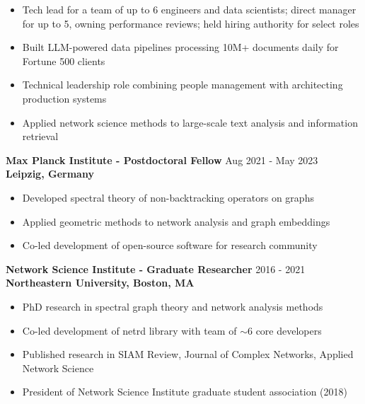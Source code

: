 \documentclass[11pt,a4paper]{article}
\newlength{\spacexs}    \setlength{\spacexs}{6pt}      %
\newlength{\spacemd}    \setlength{\spacemd}{19pt}     %
\newcommand{\bodytext}[1]{%
    {\fontsize{10pt}{14pt}\selectfont\color{charcoal} #1}%
}
\newcommand{\microtext}[1]{%
    {\fontsize{8pt}{11pt}\selectfont\color{mediumgray} #1}%
}
\newcommand{\goldbullet}{{\color{gold}$\bullet$}\space}
\newcommand{\jobduration}[1]{%
    {\fontspec{JetBrains Mono}\microtext{#1}}
}
\newcommand{\companyname}[1]{%
    {\color{darkgray}\bfseries #1}
}
\begin{document}
\vspace{\spacexs}
\begin{itemize}[leftmargin=15pt,itemindent=0pt,labelwidth=10pt,labelsep=5pt,itemsep=2pt,parsep=0pt,topsep=0pt,partopsep=0pt]
    \item[\goldbullet] \bodytext{Tech lead for a team of up to 6 engineers and data scientists; direct manager for up to 5, owning performance reviews; held hiring authority for select roles}
    \item[\goldbullet] \bodytext{Built LLM-powered data pipelines processing 10M+ documents daily for Fortune 500 clients}
    \item[\goldbullet] \bodytext{Technical leadership role combining people management with architecting production systems}
    \item[\goldbullet] \bodytext{Applied network science methods to large-scale text analysis and information retrieval}
\end{itemize}

\vspace{\spacemd}

\bodytext{\textbf{Max Planck Institute - Postdoctoral Fellow}} \hfill \jobduration{Aug 2021 - May 2023}\\
\companyname{Leipzig, Germany}

\vspace{\spacexs}
\begin{itemize}[leftmargin=15pt,itemindent=0pt,labelwidth=10pt,labelsep=5pt,itemsep=1pt,parsep=0pt,topsep=0pt,partopsep=0pt]
    \item[\goldbullet] \bodytext{Developed spectral theory of non-backtracking operators on graphs}
    \item[\goldbullet] \bodytext{Applied geometric methods to network analysis and graph embeddings}
    \item[\goldbullet] \bodytext{Co-led development of open-source software for research community}
\end{itemize}

\vspace{\spacemd}

\bodytext{\textbf{Network Science Institute - Graduate Researcher}} \hfill \jobduration{2016 - 2021}\\
\companyname{Northeastern University, Boston, MA}

\vspace{\spacexs}
\begin{itemize}[leftmargin=15pt,itemindent=0pt,labelwidth=10pt,labelsep=5pt,itemsep=1pt,parsep=0pt,topsep=0pt,partopsep=0pt]
    \item[\goldbullet] \bodytext{PhD research in spectral graph theory and network analysis methods}
    \item[\goldbullet] \bodytext{Co-led development of netrd library with team of $\sim$6 core developers}
    \item[\goldbullet] \bodytext{Published research in SIAM Review, Journal of Complex Networks, Applied Network Science}
    \item[\goldbullet] \bodytext{President of Network Science Institute graduate student association (2018)}
\end{itemize}
\end{document}
